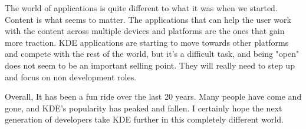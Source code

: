 The world of applications is quite different to what it was when we started. Content is what seems to matter. The applications that can help the user work with the content across multiple devices and platforms are the ones that gain more traction. KDE applications are starting to move towards other platforms and compete with the rest of the world, but it’s a difficult task, and being "open" does not seem to be an important selling point. They will really need to step up and focus on non development roles.

Overall, It has been a fun ride over the last 20 years. Many people have come and gone, and KDE’s popularity has peaked and fallen. I certainly hope the next generation of developers take KDE further in this completely different world.
